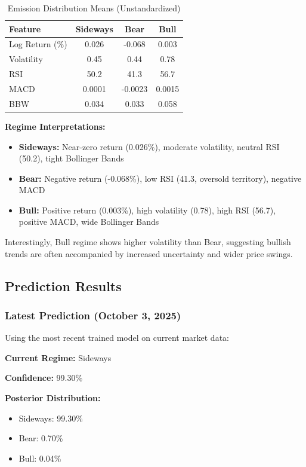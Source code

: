 \documentclass[conference]{IEEEtran}
\begin{document}
\begin{table}[htbp]
\centering
\caption{Emission Distribution Means (Unstandardized)}
\label{tab:emissions}
\begin{tabular}{lccc}
\toprule
\textbf{Feature} & \textbf{Sideways} & \textbf{Bear} & \textbf{Bull} \\
\midrule
Log Return (\%) & 0.026 & -0.068 & 0.003 \\
Volatility & 0.45 & 0.44 & 0.78 \\
RSI & 50.2 & 41.3 & 56.7 \\
MACD & 0.0001 & -0.0023 & 0.0015 \\
BBW & 0.034 & 0.033 & 0.058 \\
\bottomrule
\end{tabular}
\end{table}

\textbf{Regime Interpretations:}
\begin{itemize}
\item \textbf{Sideways:} Near-zero return (0.026\%), moderate volatility, neutral RSI (50.2), tight Bollinger Bands
\item \textbf{Bear:} Negative return (-0.068\%), low RSI (41.3, oversold territory), negative MACD
\item \textbf{Bull:} Positive return (0.003\%), high volatility (0.78), high RSI (56.7), positive MACD, wide Bollinger Bands
\end{itemize}

Interestingly, Bull regime shows higher volatility than Bear, suggesting bullish trends are often accompanied by increased uncertainty and wider price swings.

\subsection{Prediction Results}

\subsubsection{Latest Prediction (October 3, 2025)}
Using the most recent trained model on current market data:

\textbf{Current Regime:} Sideways

\textbf{Confidence:} 99.30\%

\textbf{Posterior Distribution:}
\begin{itemize}
\item Sideways: 99.30\%
\item Bear: 0.70\%
\item Bull: 0.04\%
\end{itemize}
\end{document}
